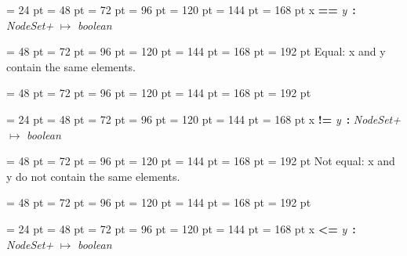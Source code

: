 {{{{{\par}
\par}
\par}
\par}
{\par \noindent  \leftskip = 24 pt  \leftmargini = 48 pt  \leftmarginii = 72 pt  \leftmarginiii = 96 pt  \leftmarginiv = 120 pt  \leftmarginv = 144 pt  \leftmarginvi = 168 pt x {\large {\bf ==\/}} {\em y\/}~{\bf :}  {\em NodeSet+\/} \(\mapsto \)  {\em boolean\/}{\par \noindent
{\par \noindent  \leftskip = 48 pt  \leftmargini = 72 pt  \leftmarginii = 96 pt  \leftmarginiii = 120 pt  \leftmarginiv = 144 pt  \leftmarginv = 168 pt  \leftmarginvi = 192 pt 
Equal:
    x and y contain the same elements.
\par}
{\par \noindent  \leftskip = 48 pt  \leftmargini = 72 pt  \leftmarginii = 96 pt  \leftmarginiii = 120 pt  \leftmarginiv = 144 pt  \leftmarginv = 168 pt  \leftmarginvi = 192 pt {\par \noindent
\par}
\par}
\par}
\par}
{\par \noindent  \leftskip = 24 pt  \leftmargini = 48 pt  \leftmarginii = 72 pt  \leftmarginiii = 96 pt  \leftmarginiv = 120 pt  \leftmarginv = 144 pt  \leftmarginvi = 168 pt x {\large {\bf !=\/}} {\em y\/}~{\bf :}  {\em NodeSet+\/} \(\mapsto \)  {\em boolean\/}{\par \noindent
{\par \noindent  \leftskip = 48 pt  \leftmargini = 72 pt  \leftmarginii = 96 pt  \leftmarginiii = 120 pt  \leftmarginiv = 144 pt  \leftmarginv = 168 pt  \leftmarginvi = 192 pt 
Not equal:
             x and y do not contain the same elements.
\par}
{\par \noindent  \leftskip = 48 pt  \leftmargini = 72 pt  \leftmarginii = 96 pt  \leftmarginiii = 120 pt  \leftmarginiv = 144 pt  \leftmarginv = 168 pt  \leftmarginvi = 192 pt {\par \noindent
\par}
\par}
\par}
\par}
{\par \noindent  \leftskip = 24 pt  \leftmargini = 48 pt  \leftmarginii = 72 pt  \leftmarginiii = 96 pt  \leftmarginiv = 120 pt  \leftmarginv = 144 pt  \leftmarginvi = 168 pt x {\large {\bf {\textless}=\/}} {\em y\/}~{\bf :}  {\em NodeSet+\/} \(\mapsto \)  {\em boolean\/}{\par \noindent
}}}
